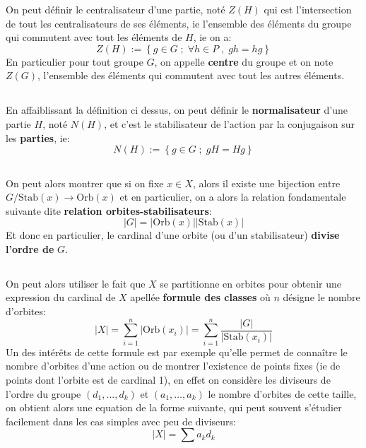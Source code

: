 On peut définir le centralisateur d'une partie, noté \( Z(H) \) qui est l'intersection de tout les centralisateurs de ses éléments, ie l'ensemble des éléments du groupe qui commutent avec tout les éléments de \( H \), ie on a:
\[ 
   Z(H) := \left\{ g \in G \; ; \; \forall h \in P \; , \; gh = hg\right\}  
\]
En particulier pour tout groupe \( G \), on appelle \textbf{centre} du groupe et on note \( Z(G) \), l'ensemble des éléments qui commutent avec tout les autres éléments. 
\subsection*{}
En affaiblissant la définition ci dessus, on peut définir le \textbf{normalisateur} d'une partie \( H \), noté \( N(H) \), et c'est le stabilisateur de l'action par la conjugaison sur les \textbf{parties}, ie:
\[ 
   N(H) := \left\{ g \in G \; ; \; gH = Hg\right\}  
\]
\subsection*{}
On peut alors montrer que si on fixe \( x \in X \), alors il existe une bijection entre \( G/\text{Stab}(x) \longrightarrow \text{Orb}(x)\) et en particulier, on a alors la relation fondamentale suivante dite \textbf{relation orbites-stabilisateurs}:
\[ 
   \left|G \right| = \left|\text{Orb}(x)\right| \left|\text{Stab}(x)\right|
\]
Et donc en particulier, le cardinal d'une orbite (ou d'un stabilisateur) \textbf{divise l'ordre de } \( G \).
\subsection*{}
On peut alors utiliser le fait que \( X \) se partitionne en orbites pour obtenir une expression du cardinal de \( X \) apellée \textbf{formule des classes} où \( n \) désigne le nombre d'orbites:
\[ 
   \left|X\right| = \sum_{i = 1}^n  \left| \text{Orb}(x_i) \right| = \sum_{i = 1}^n  \frac{\left|G \right|}{\left|\text{Stab}(x_i)\right|}
\]
Un des intérêts de cette formule est par exemple qu'elle permet de connaître le nombre d'orbites d'une action ou de montrer l'existence de points fixes (ie de points dont l'orbite est de cardinal 1), en effet on considère les diviseurs de l'ordre du groupe \( (d_1, \ldots, d_k) \) et \( (a_1, \ldots, a_k) \) le nombre d'orbites de cette taille, on obtient alors une equation de la forme suivante, qui peut souvent s'étudier facilement dans les cas simples avec peu de diviseurs:
\[ 
   |X| = \sum a_kd_k 
\]
